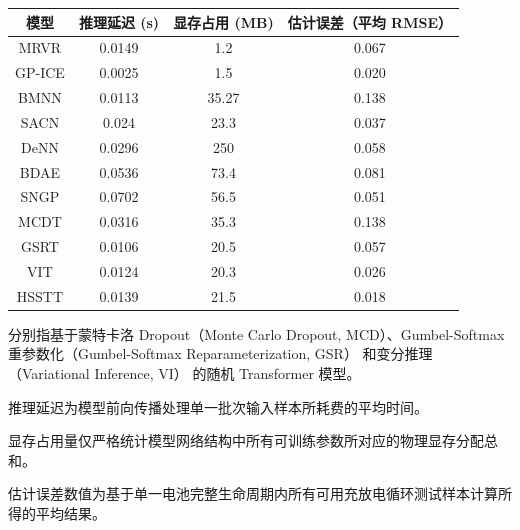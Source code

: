 \begin{table}[htbp]
\centering
{}
\label{tab:HSSTT_efficiency}
\begin{threeparttable}
\begin{tabular}{cccc}
\toprule
\multicolumn{1}{c}{模型} & \multicolumn{1}{c}{推理延迟 (s)\tnote{d}} & \multicolumn{1}{c}{显存占用 (MB)\tnote{e}} & \multicolumn{1}{c}{估计误差（平均 RMSE）\tnote{f}}\\
\midrule
MRVR  & 0.0149 & 1.2 & 0.067 \\
GP-ICE & 0.0025 & 1.5 & 0.020 \\
BMNN  & 0.0113 & 35.27 & 0.138 \\
SACN  & 0.024 & 23.3 & 0.037 \\
DeNN  & 0.0296 & 250 & 0.058 \\
BDAE  & 0.0536 & 73.4 & 0.081 \\
SNGP  & 0.0702 & 56.5 & 0.051 \\
MCDT \tnote{a}  & 0.0316 & 35.3 & 0.138 \\
GSRT \tnote{b}  & 0.0106 & 20.5 & 0.057 \\
VIT \tnote{c}   & 0.0124 & 20.3 & 0.026 \\
HSSTT & 0.0139 & 21.5 & 0.018 \\
\bottomrule
\end{tabular}
\begin{tablenotes}[flushleft]
  \item[a, b, c] 分别指基于蒙特卡洛 Dropout（Monte Carlo Dropout, MCD）\cite{20164903082858}、Gumbel-Softmax 重参数化（Gumbel-Softmax Reparameterization, GSR）\cite{20193407356730} 和变分推理（Variational Inference, VI）\cite{20191806851746} 的随机 Transformer 模型。
  \item[d] 推理延迟为模型前向传播处理单一批次输入样本所耗费的平均时间。
  \item[e] 显存占用量仅严格统计模型网络结构中所有可训练参数所对应的物理显存分配总和。
  \item[f] 估计误差数值为基于单一电池完整生命周期内所有可用充放电循环测试样本计算所得的平均结果。
\end{tablenotes}
\end{threeparttable}
\end{table}

